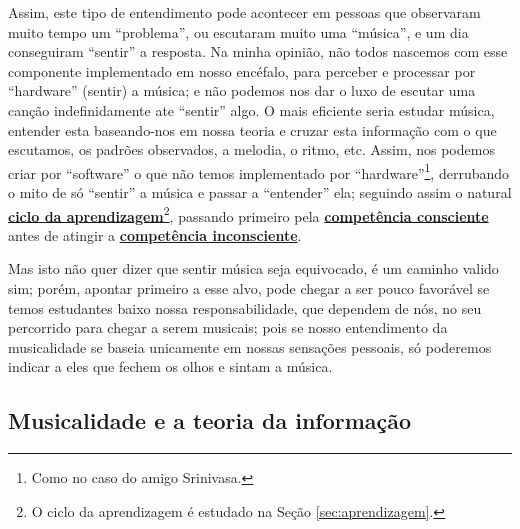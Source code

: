 Assim, este tipo de entendimento  pode acontecer em pessoas que observaram muito tempo um ``problema'', 
ou escutaram muito uma ``música'', 
e um dia conseguiram ``sentir'' a resposta. 
Na minha opinião, 
não todos nascemos com esse componente implementado em nosso encéfalo, para perceber e processar por ``hardware'' (sentir) a música; 
e não podemos nos dar o luxo de escutar uma canção indefinidamente ate ``sentir'' algo. 
O mais eficiente seria estudar música, 
entender esta baseando-nos em nossa teoria e cruzar esta informação com o que escutamos,
os padrões observados, a melodia, o ritmo, etc. 
Assim, nos podemos criar por ``software'' o que não temos implementado por ``hardware''\footnote{Como no caso do amigo Srinivasa.}, 
derrubando o mito de só ``sentir'' a música e passar a ``entender'' ela;
seguindo assim o natural \hyperref[sec:aprendizagem]{\textbf{ciclo da aprendizagem}}\footnote{O
ciclo da aprendizagem é estudado na Seção \ref{sec:aprendizagem}.}, passando primeiro pela 
\hyperref[ref:CompetenciaConsciente]{\textbf{competência consciente}} 
antes de atingir a  \hyperref[ref:CompetenciaInconsciente]{\textbf{competência inconsciente}}.

Mas isto não quer dizer que sentir música seja equivocado, é um caminho valido sim;
porém, apontar primeiro a esse alvo, 
pode chegar a ser pouco favorável se temos estudantes baixo nossa responsabilidade,
 que dependem de nós, no seu percorrido para chegar a serem musicais; 
pois se nosso entendimento da musicalidade se baseia unicamente em nossas sensações pessoais,
só poderemos indicar a eles que fechem os olhos e sintam a música.


\subsection{Musicalidade e a teoria da informação}
\label{sec:musicalidadeinfmutua}


